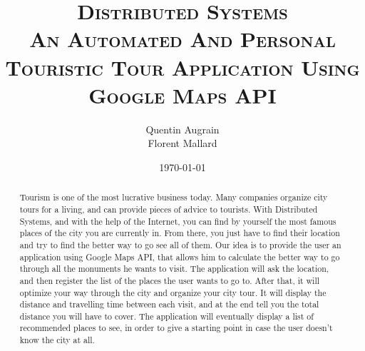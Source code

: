 \documentclass[a4paper]{article}
\title{
\textsc{Distributed Systems\\
\LARGE An Automated And Personal Touristic Tour Application Using Google Maps API }
}
\author
{
	Quentin {\sc Augrain}\\
    Florent {\sc Mallard}\\
}
\date{\today}
\begin{document}
\maketitle

\begin{abstract}
	Tourism is one of the most lucrative business today. Many companies organize city tours for a living, and can provide pieces of advice to tourists. With Distributed Systems, and with the help of the Internet, you can find by yourself the most famous places of the city you are currently in. From there, you just have to find their location and try to find the better way to go see all of them. Our idea is to provide the user an application using Google Maps API, that allows him to calculate the better way to go through all the monuments he wants to visit. The application will ask the location, and then register the list of the places the user wants to go to. After that, it will optimize your way through the city and organize your city tour. It will display the distance and travelling time between each visit, and at the end tell you the total distance you will have to cover. The application will eventually display a list of recommended places to see, in order to give a starting point in case the user doesn't know the city at all.
\end{abstract}
\end{document}
